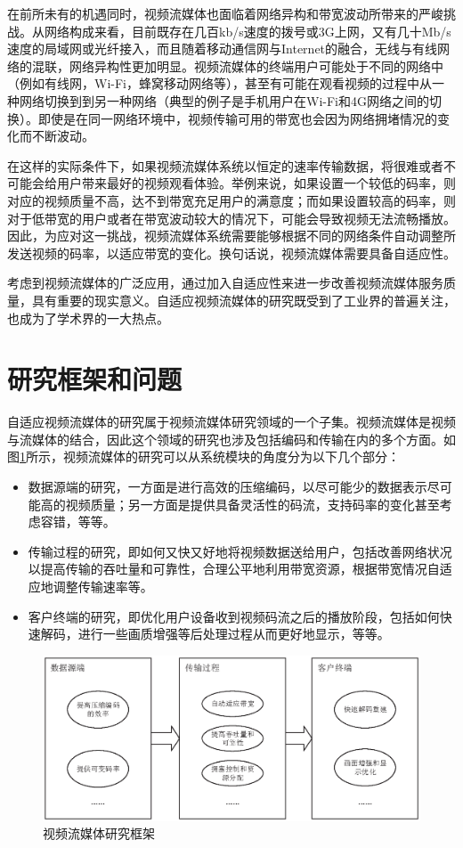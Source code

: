 在前所未有的机遇同时，视频流媒体也面临着网络异构和带宽波动所带来的严峻挑战。从网络构成来看，目前既存在几百kb/s速度的拨号或3G上网，又有几十Mb/s速度的局域网或光纤接入，而且随着移动通信网与Internet的融合，无线与有线网络的混联，网络异构性更加明显。视频流媒体的终端用户可能处于不同的网络中（例如有线网，Wi-Fi，蜂窝移动网络等），甚至有可能在观看视频的过程中从一种网络切换到到另一种网络（典型的例子是手机用户在Wi-Fi和4G网络之间的切换）。即使是在同一网络环境中，视频传输可用的带宽也会因为网络拥堵情况的变化而不断波动。

在这样的实际条件下，如果视频流媒体系统以恒定的速率传输数据，将很难或者不可能会给用户带来最好的视频观看体验。举例来说，如果设置一个较低的码率，则对应的视频质量不高，达不到带宽充足用户的满意度；而如果设置较高的码率，则对于低带宽的用户或者在带宽波动较大的情况下，可能会导致视频无法流畅播放。因此，为应对这一挑战，视频流媒体系统需要能够根据不同的网络条件自动调整所发送视频的码率，以适应带宽的变化。换句话说，视频流媒体需要具备自适应性。

考虑到视频流媒体的广泛应用，通过加入自适应性来进一步改善视频流媒体服务质量，具有重要的现实意义。自适应视频流媒体的研究既受到了工业界的普遍关注，也成为了学术界的一大热点。

\section{研究框架和问题}

自适应视频流媒体的研究属于视频流媒体研究领域的一个子集。视频流媒体是视频与流媒体的结合，因此这个领域的研究也涉及包括编码和传输在内的多个方面。如图\ref{fig:research-framework}所示，视频流媒体的研究可以从系统模块的角度分为以下几个部分：

\begin{itemize}
	\item 数据源端的研究，一方面是进行高效的压缩编码，以尽可能少的数据表示尽可能高的视频质量；另一方面是提供具备灵活性的码流，支持码率的变化甚至考虑容错，等等。
	\item 传输过程的研究，即如何又快又好地将视频数据送给用户，包括改善网络状况以提高传输的吞吐量和可靠性，合理公平地利用带宽资源，根据带宽情况自适应地调整传输速率等。
	\item 客户终端的研究，即优化用户设备收到视频码流之后的播放阶段，包括如何快速解码，进行一些画质增强等后处理过程从而更好地显示，等等。
\end{itemize}

\begin{figure}[t]
	\centering
	\vspace{10pt}
	\includegraphics[width = 1.0\linewidth]{eps/research-framework}
	\caption{视频流媒体研究框架 \label{fig:research-framework}}
\end{figure}

